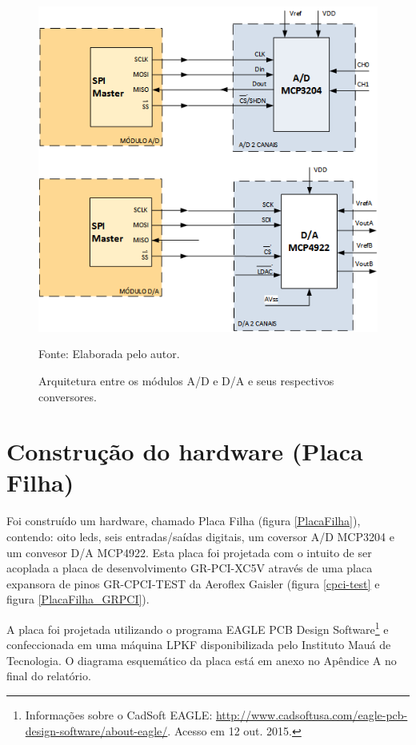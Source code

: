 \begin{figure}[!htb]
	\centering
	\caption{Arquitetura entre os módulos A/D e D/A e seus respectivos conversores.}
	\includegraphics[scale = 0.9]{Imagens/Arch_conversores}
	
	Fonte: Elaborada pelo autor.
	
	\label{Arch_conversores}
\end{figure}


\vfill

\section{Construção do hardware (Placa Filha)}

Foi construído um hardware, chamado Placa Filha (figura \ref{PlacaFilha}), contendo: oito leds, seis entradas/saídas digitais, um coversor A/D MCP3204 e um convesor D/A MCP4922. Esta placa foi projetada com o intuito de ser acoplada a placa de desenvolvimento GR-PCI-XC5V através de uma placa expansora de pinos GR-CPCI-TEST da Aeroflex Gaisler (figura \ref{cpci-test} e figura \ref{PlacaFilha_GRPCI}).

A placa foi projetada utilizando o programa EAGLE PCB Design Software\footnote{Informações sobre o CadSoft EAGLE: \url{http://www.cadsoftusa.com/eagle-pcb-design-software/about-eagle/}. Acesso em 12 out. 2015.} e confeccionada em uma máquina LPKF disponibilizada pelo Instituto Mauá de Tecnologia. O diagrama esquemático da placa está em anexo no Apêndice A no final do relatório.

